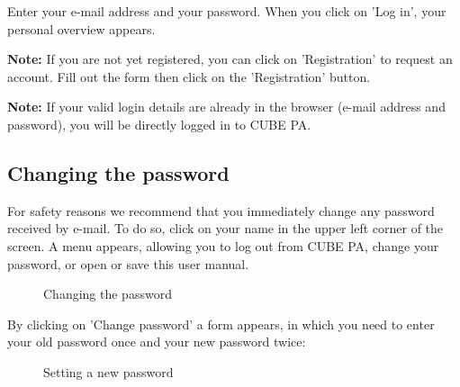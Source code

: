 Enter your e-mail address and your password. When you click on 'Log in', your personal overview appears.

\vspace{\baselineskip}

\textbf{Note:} If you are not yet registered, you can click on 'Registration' to request an account. Fill out the form then click on the 'Registration' button.

\vspace{\baselineskip}

\textbf{Note:} If your valid login details are already in the browser (e-mail address and password), you will be directly logged in to CUBE PA.

\subsection{Changing the password}
\label{bkm:Ref434828103}

For safety reasons we recommend that you immediately change any password received by e-mail. To do so, click on your name in the upper left corner of the screen. A menu appears, allowing you to log out from CUBE PA, change your password, or open or save this user manual.

\begin{figure}[H]
\caption{Changing the password}
\end{figure}

By clicking on 'Change password' a form appears, in which you need to enter your old password once and your new password twice:

\begin{figure}[H]
\caption{Setting a new password}
\end{figure}

